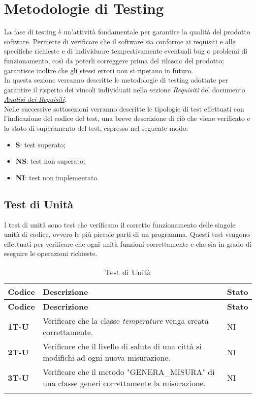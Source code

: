\section{Metodologie di Testing}
La fase di testing è un'attività fondamentale per garantire la qualità del prodotto software. Permette di verificare che il software sia conforme ai requisiti e alle specifiche richieste e di individuare tempestivamente eventuali bug o problemi di funzionamento, così da poterli correggere prima del rilascio del prodotto; garantisce inoltre che gli stessi errori non si ripetano in futuro. \\
In questa sezione verranno descritte le metodologie di testing adottate per garantire il rispetto dei vincoli individuati nella sezione \textit{Requisiti} del documento \href{https://7last.github.io/docs/rtb/documentazione-esterna/analisi-dei-requisiti}{\textit{Analisi dei Requisiti}}. \\ %
Nelle successive sottosezioni verranno descritte le tipologie di test effettuati con l'indicazione del codice del test, una breve descrizione di ciò che viene verificato e lo stato di superamento del test, espresso nel seguente modo: \\
\begin{itemize}
    \item \textbf{S}: test superato;
    \item \textbf{NS}: test non superato;
    \item \textbf{NI}: test non implementato.
\end{itemize}

\subsection{Test di Unità}
I test di unità sono test che verificano il corretto funzionamento delle singole unità di codice, ovvero le più piccole parti di un programma. Questi test vengono effettuati per verificare che ogni unità funzioni correttamente e che sia in grado di eseguire le operazioni richieste. \\
\begin{longtable}{|>{\raggedright\arraybackslash}m{}|>{\raggedright\arraybackslash}m{}|>{\raggedright\arraybackslash}m{}|}
	\hline
	\textbf{Codice} & \textbf{Descrizione} & \textbf{Stato} \\
	\hline
	\endfirsthead
	\hline
	\textbf{Codice} & \textbf{Descrizione} & \textbf{Stato} \\
	\endhead
	\textbf{1T-U}   & Verificare che la classe \textit{temperature} venga creata correttamente. & NI\\
	\hline
	\textbf{2T-U}   & Verificare che il livello di salute di una città si modifichi ad ogni nuova misurazione. & NI\\
	\hline
	\textbf{3T-U}   & Verificare che il metodo "GENERA\_MISURA" di una classe generi correttamente la misurazione. & NI\\
	\hline
	\caption{Test di Unità}
	\label{table:12}
\end{longtable}

